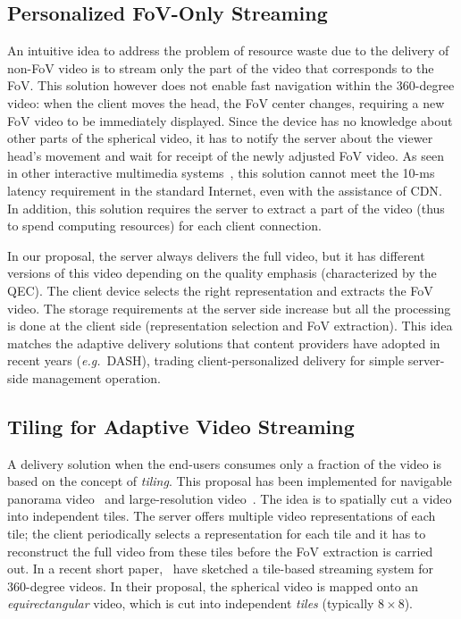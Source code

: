\subsection{Personalized FoV-Only Streaming}

An intuitive idea to address the problem of resource waste due to the delivery of non-FoV video
is to stream only the part of the video that corresponds to the \ac{FoV}. This solution however
does not enable fast navigation within the 360-degree video: when the client moves the head,
the FoV
center changes, requiring a new FoV video to be immediately displayed. Since
the device has no knowledge about other parts of the spherical video, it has to notify
the server about the viewer head's movement and wait for receipt of the newly
adjusted FoV video. As seen in other interactive multimedia systems~\cite{ChoyWSR14},
this solution cannot meet the 10-ms latency requirement in the standard Internet, even
with the assistance of \ac{CDN}. In addition, this solution requires the server to extract
a part of the video (thus to spend computing resources) for each
client connection.

 In our proposal, the server always delivers the full video, but it
has different versions of this video depending on the quality emphasis (characterized by the QEC).
The client
device selects the right representation and extracts the \ac{FoV} video. The storage
requirements at the
server side increase but all the processing is done at the client side (representation selection
and FoV extraction).
This idea matches the adaptive delivery solutions
that content providers have adopted in recent years (\textit{e.g.}~\ac{DASH}),
trading client-personalized delivery for simple server-side management operation.

\subsection{Tiling for Adaptive Video Streaming}

A delivery solution when the end-users consumes only a fraction of the video is based on the concept of \emph{tiling}.
This proposal has been implemented for navigable panorama
video~\cite{sanchez_compressed_2015,wang_mixing_2014,gaddam_tiling_2015} and
large-resolution video~\cite{jean16mmsys}.
The idea is to spatially cut a video into independent tiles. The server offers
multiple video representations of each tile; the client periodically selects a representation
for each tile
and it has to reconstruct
the full video from these tiles before the \ac{FoV} extraction is carried out. In a recent short
paper,~\citet{ochi_live_2015} have sketched a tile-based streaming system for 360-degree
videos.
In their proposal, the spherical video is mapped onto an \emph{equirectangular} video, which
is cut into independent \emph{tiles} (typically $8\times 8$).

